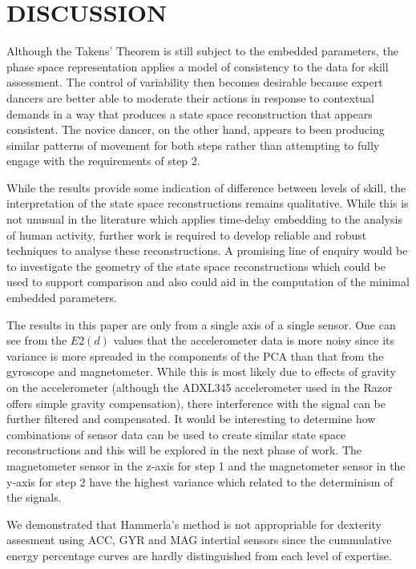 \documentclass{sigchi}
\begin{document}
\section{DISCUSSION}
Although the Takens' Theorem is still subject to the embedded parameters, 
the phase space representation applies a model of consistency to the data for skill assessment. 
The control of variability then becomes desirable because expert dancers are better able to moderate 
their actions in response to contextual demands in a way that produces a state space reconstruction 
that appears consistent.  The novice dancer, on the other hand, appears to been producing similar 
patterns of movement for both steps rather than attempting to fully engage with the requirements of step 2.  

While the results provide some indication of difference between levels of skill, the interpretation of 
the state space reconstructions remains qualitative.  While this is not unusual in the literature
which applies time-delay embedding to the analysis of human activity, further work is required to develop 
reliable and robust techniques to analyse these reconstructions.  
A promising line of enquiry would be to investigate the geometry of the state space reconstructions
which could be used to support comparison \cite{Sama2013} and also could aid in the computation of the minimal 
embedded parameters. 
 
The results in this paper are only from a single axis of a single sensor. 
One can see from the $E2(d)$ values that the accelerometer data is more noisy since its variance is 
more spreaded in the components of the PCA than that from the gyroscope and magnetometer.  
While this is most likely due to effects of gravity on the accelerometer 
(although the ADXL345 accelerometer used in the Razor offers simple gravity compensation), 
there interference with the signal can be further filtered and compensated.  
It would be interesting to determine how combinations of sensor data can be used to create similar 
state space reconstructions and this will be explored in the next phase of work. 
The magnetometer sensor in the z-axis for step 1 and the magnetometer sensor in the y-axis for step 2
have the highest variance which related to the determinism of the signals.

We demonstrated that Hammerla's method is not appropriable for dexterity assesment using ACC, GYR and MAG intertial sensors since the cummulative energy percentage curves are hardly distinguished
from each level of expertise.
\end{document}
